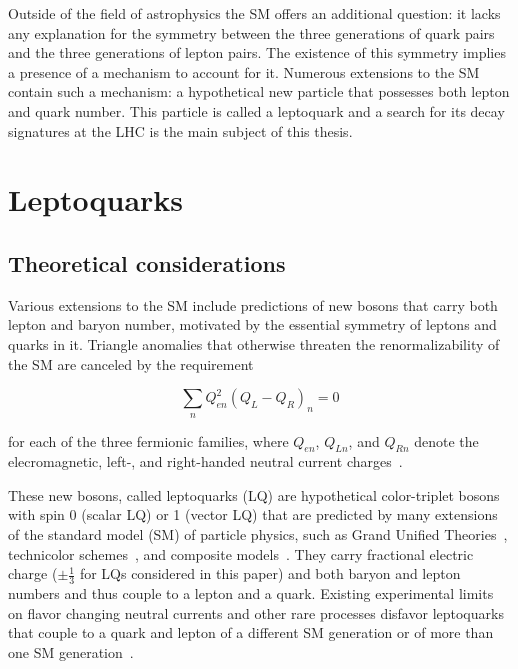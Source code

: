 Outside of the field of astrophysics the SM offers an additional question: it lacks any explanation for the symmetry between the three generations of quark pairs and the three generations of lepton pairs.  The existence of this symmetry implies a presence of a mechanism to account for it.  Numerous extensions to the SM contain such a mechanism: a hypothetical new particle that possesses both lepton and quark number.  This particle is called a leptoquark and a search for its decay signatures at the LHC is the main subject of this thesis.


\section{Leptoquarks}

\subsection{Theoretical considerations}
\label{theoreticalconsiderations}

Various extensions to the SM include predictions of new bosons that carry both lepton and baryon number, motivated by the essential symmetry of leptons and quarks in it.  Triangle anomalies that otherwise threaten the renormalizability of the SM are canceled by the requirement

\begin{equation}
\sum_{n} Q^{2}_{en} (Q_{L}-Q_{R})_{n} = 0
\label{eq:TriangleCancellation}
\end{equation}

for each of the three fermionic families, where $Q_{en}$, $Q_{Ln}$, and $Q_{Rn}$ denote the elecromagnetic, left-, and right-handed neutral current charges~\cite{Blumlein:1996qp}.  


These new bosons, called leptoquarks (LQ) are hypothetical color-triplet bosons with spin 0 (scalar LQ) or 1 (vector LQ) that are predicted by many extensions of the
standard model (SM) of particle physics, such as Grand Unified Theories~\cite{PhysRevLett.32.438,Pati:1973uk,Pati:1974yy,Murayama:1991ah,Fritzsch:1974nn,Senjanovic:1982ex,PhysRevLett.65.2209,Frampton:1990hz}, technicolor schemes~\cite{Dimopoulos:1979es,Dimopoulos:1979sp,Farhi:1980xs}, and composite models~\cite{Schrempp:1984nj}. They carry fractional electric charge ($\pm \frac{1}{3}$ for LQs considered in this paper) and both baryon and lepton numbers and thus couple to a lepton
and a quark.  Existing experimental
limits on flavor changing neutral currents and other
rare processes disfavor leptoquarks that couple to a quark and lepton of a different SM generation or of more than one SM generation~\cite{Buchmuller:1986iq,FCNC}.  

